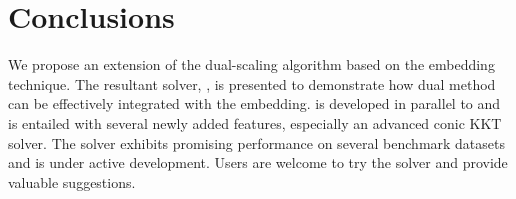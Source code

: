 \section{Conclusions}

We propose an extension of the dual-scaling algorithm based on
the embedding technique. The resultant solver, , is presented to
demonstrate how dual method can be effectively integrated with the embedding. 
 is developed in parallel to  and
is entailed with several newly added features, especially an advanced conic KKT solver. The solver
exhibits promising performance on several benchmark datasets and is under
active development. Users are welcome to try the solver and provide valuable suggestions.